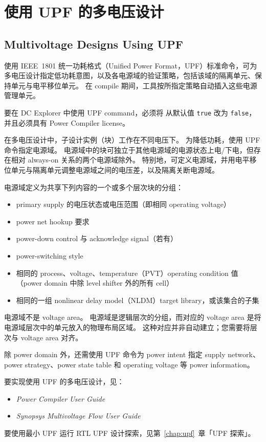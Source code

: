 \section{使用 UPF 的多电压设计}
\subsection*{Multivoltage Designs Using UPF}

使用 IEEE\texttrademark\ 1801 统一功耗格式（Unified Power Format，UPF）标准命令，可为多电压设计指定低功耗意图，以及各电源域的验证策略，包括该域的隔离单元、保持单元与电平移位单元。
在 compile 期间，工具按所指定策略自动插入这些电源管理单元。

要在 DC Explorer 中使用 UPF command，必须将  从默认值 \texttt{true} 改为 \texttt{false}，并且必须具有 Power Compiler license。

在多电压设计中，子设计实例（块）工作在不同电压下。
为降低功耗，使用 UPF 命令指定电源域。
电源域中的块可独立于其他电源域的电源状态上电/下电，但存在相对 always-on 关系的两个电源域除外。
特别地，可定义电源域，并用电平移位单元与隔离单元调整电源域之间的电压差，以及隔离关断电源域。

电源域定义为共享下列内容的一个或多个层次块的分组：
\begin{itemize}
  \item primary supply 的电压状态或电压范围（即相同 operating voltage）
  \item power net hookup 要求
  \item power-down control 与 acknowledge signal（若有）
  \item power-switching style
  \item 相同的 process、voltage、temperature（PVT）operating condition 值（power domain 中除 level shifter 外的所有 cell）
  \item 相同的一组 nonlinear delay model（NLDM）target library，或该集合的子集
\end{itemize}

电源域不是 voltage area。
电源域是逻辑层次的分组，而对应的 voltage area 是将电源域层次中的单元放入的物理布局区域。
这种对应并非自动建立；您需要将层次与 voltage area 对齐。

除 power domain 外，还需使用 UPF 命令为 power intent 指定 supply network、power strategy、power state table 和 operating voltage 等 power information。

要实现使用 UPF 的多电压设计，见：
\begin{itemize}
  \item \textit{Power Compiler User Guide}
  \item \textit{Synopsys Multivoltage Flow User Guide}
\end{itemize}

要使用最小 UPF 运行 RTL UPF 设计探索，见第~\ref{chap:upf}~章「UPF 探索」。
